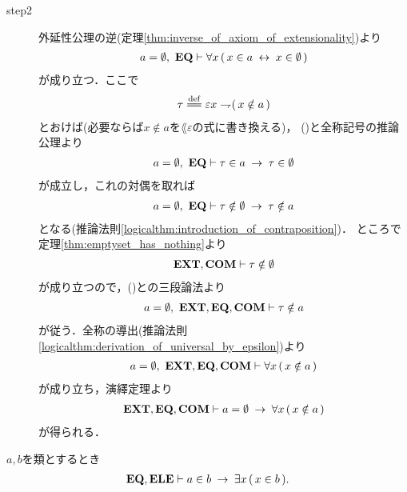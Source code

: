 \begin{prf}
\begin{description}
			\item[step2]
				外延性公理の逆(定理\ref{thm:inverse_of_axiom_of_extensionality})より
				\begin{align}
					a = \emptyset,\ \mbox{{\bf EQ}} \vdash
					\forall x\, (\, x \in a \hspace{0.25em}\leftrightarrow\hspace{0.25em} x \in \emptyset\, )
					\label{fom:uniqueness_of_emptyset_3}
				\end{align}
				が成り立つ．ここで
				\begin{align}
					\tau \defeq \varepsilon x \negation (\, x \notin a\, )
				\end{align}
				とおけば(必要ならば$x \notin a$を$\lang{\varepsilon}$の式に書き換える)，
				()と全称記号の推論公理より
				\begin{align}
					a = \emptyset,\ \mbox{{\bf EQ}} \vdash \tau \in a \hspace{0.25em}\rightarrow\hspace{0.25em} \tau \in \emptyset
				\end{align}
				が成立し，これの対偶を取れば
				\begin{align}
					a = \emptyset,\ \mbox{{\bf EQ}} \vdash 
					\tau \notin \emptyset \hspace{0.25em}\rightarrow\hspace{0.25em} \tau \notin a
					\label{fom:uniqueness_of_emptyset_4}
				\end{align}
				となる(推論法則\ref{logicalthm:introduction_of_contraposition})．
				ところで定理\ref{thm:emptyset_has_nothing}より
				\begin{align}
					\mbox{{\bf EXT}},\mbox{\bf COM} \vdash \tau \notin \emptyset
				\end{align}
				が成り立つので，()との三段論法より
				\begin{align}
					a = \emptyset,\ \mbox{{\bf EXT}},\mbox{{\bf EQ}},\mbox{\bf COM} \vdash \tau \notin a
				\end{align}
				が従う．全称の導出(推論法則\ref{logicalthm:derivation_of_universal_by_epsilon})より
				\begin{align}
					a = \emptyset,\ \mbox{{\bf EXT}},\mbox{{\bf EQ}},\mbox{\bf COM} \vdash 
					\forall x\, (\, x \notin a\, )
				\end{align}
				が成り立ち，演繹定理より
				\begin{align}
					\mbox{{\bf EXT}},\mbox{{\bf EQ}},\mbox{\bf COM} \vdash 
					a = \emptyset \hspace{0.25em}\rightarrow\hspace{0.25em} \forall x\, (\, x \notin a\, )
				\end{align}
				が得られる．
				\QED
		\end{description}
	\end{prf}
	
	\begin{screen}
		\begin{thm}[類を要素として持てば空ではない]
		\label{thm:emptyset_does_not_contain_any_class}
			$a,b$を類とするとき
			\begin{align}
				\mbox{{\bf EQ}},\mbox{{\bf ELE}} \vdash a \in b \hspace{0.25em}\rightarrow\hspace{0.25em} \exists x\, (\, x \in b\, ).
			\end{align}
		\end{thm}
	\end{screen}
	
